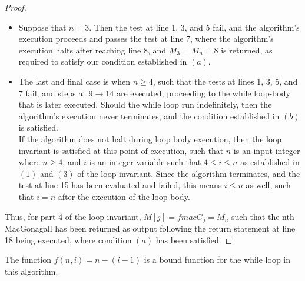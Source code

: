\documentclass[12pt]{article}
\newenvironment{problem}[2][Problem]{\begin{trivlist}
\item[\hskip \labelsep {\bfseries #1}\hskip \labelsep {\bfseries #2.}]}{\end{trivlist}}
\begin{document}
\begin{proof}
\begin{itemize}
\item Suppose that $n = 3$. Then the test at line 1, 3, and 5 fail, and the algorithm's execution proceeds and passes the test at line 7, where the algorithm's execution halts after reaching line 8, and $M_3 = M_n = 8$ is returned, as required to satisfy our condition established in $(a)$.

\item The last and final case is when $n \geq 4$, such that the tests at lines 1, 3, 5, and 7 fail, and steps at $9 \rightarrow 14$ are executed, proceeding to the while loop-body that is later executed. Should the while loop run indefinitely, then the algorithm's execution never terminates, and the condition established in $(b)$ is satisfied. \\

If the algorithm does not halt during loop body execution, then the loop invariant is satisfied at this point of execution, such that $n$ is an input integer where $n \geq 4$, and $i$ is an integer variable such that $4 \leq i \leq n$ as established in $(1)$ and $(3)$ of the loop invariant. Since the algorithm terminates, and the test at line 15 has been evaluated and failed, this means $i \leq n$ as well, such that $i = n$ after the execution of the loop body.

\end{itemize}

\noindent
Thus, for part 4 of the loop invariant, $M[j] = fmacG_j = M_n$ such that the nth MacGonagall has been returned as output following the return statement at line 18 being executed, where condition $(a)$ has been satisfied.

\end{proof}


\begin{problem}{9}
    The function $f\left(n,i\right) = n - (i - 1)$ is a bound function for the while
    loop in this algorithm. 
\end{problem}
\end{document}
